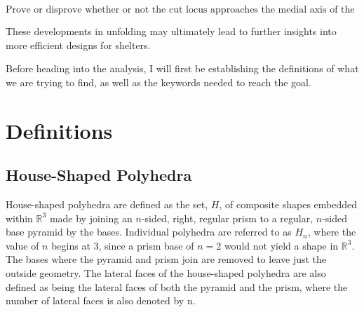 \documentclass[12 pt]{article}
\begin{document}
$$\mbox{Prove or disprove whether or not the cut locus approaches the medial axis of the house-shaped polyhedra as the number of lateral sides increase and as they approach a smooth surface.}$$

These developments in unfolding may ultimately lead to further insights into more efficient designs for shelters.

	Before heading into the analysis, I will first be establishing the definitions of what we are trying to find, as well as the keywords needed to reach the goal.

\section{Definitions}

\subsection*{House-Shaped Polyhedra}
House-shaped polyhedra are defined as the set, $H$, of composite shapes embedded within $\mathbb{R}^3$ made by joining an $n$-sided, right, regular prism to a regular, $n$-sided base pyramid by the bases. Individual polyhedra are referred to as $H_n$, where the value of $n$  begins at 3, since a prism base of $n=2$ would not yield a shape in $\mathbb{R}^3$. The bases where the pyramid and prism join are removed to leave just the outside geometry. The lateral faces of the house-shaped polyhedra are also defined as being the lateral faces of both the pyramid and the prism, where the number of lateral faces is also denoted by n.
\end{document}
